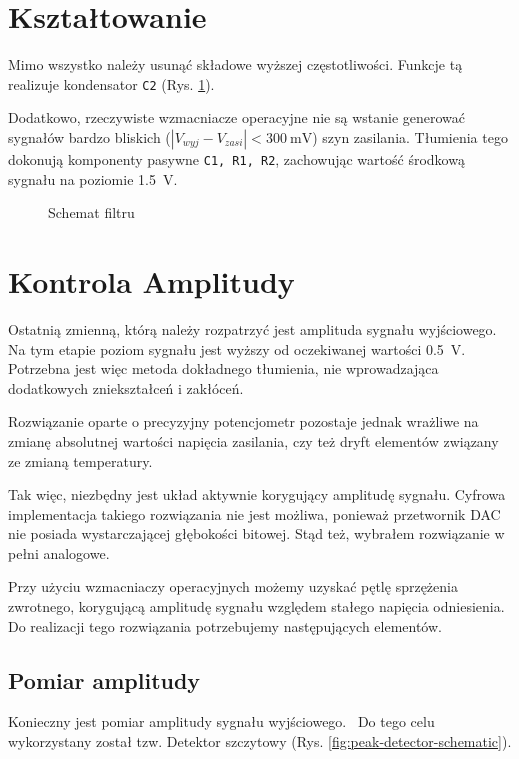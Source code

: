 \documentclass[12pt, a4paper]{article}
\begin{document}
\section{Kształtowanie}
Mimo wszystko należy usunąć składowe wyższej częstotliwości. Funkcje tą realizuje kondensator \verb|C2| (Rys. \ref{fig:filter}).

Dodatkowo, rzeczywiste wzmacniacze operacyjne nie są wstanie generować sygnałów bardzo bliskich ($ |V_{wyj} - V_{zasi}| <\qty{300}{\mV}$) szyn zasilania.
Tłumienia tego dokonują komponenty pasywne \verb|C1, R1, R2|, zachowując wartość środkową sygnału na poziomie \qty{1,5}{\V}.

\begin{figure}[h]
	\centering
	
	\caption{Schemat filtru}
	\label{fig:filter}
\end{figure}

\section{Kontrola Amplitudy}

Ostatnią zmienną, którą należy rozpatrzyć jest amplituda sygnału wyjściowego. Na tym etapie poziom sygnału jest wyższy od oczekiwanej wartości
\qty{0,5}{\V}. Potrzebna jest więc metoda dokładnego tłumienia, nie wprowadzająca dodatkowych zniekształceń i zakłóceń.

Rozwiązanie oparte o precyzyjny potencjometr pozostaje jednak wrażliwe na zmianę absolutnej wartości napięcia zasilania,
czy też dryft elementów związany ze zmianą temperatury.

Tak więc, niezbędny jest układ aktywnie korygujący amplitudę sygnału.
Cyfrowa implementacja takiego rozwiązania nie jest możliwa, 
ponieważ przetwornik DAC nie posiada wystarczającej głębokości bitowej. 
Stąd też, wybrałem rozwiązanie w pełni analogowe.

Przy użyciu wzmacniaczy operacyjnych możemy uzyskać pętlę sprzężenia zwrotnego, 
korygującą amplitudę sygnału względem stałego napięcia odniesienia.
Do realizacji tego rozwiązania potrzebujemy następujących elementów.

\subsection{Pomiar amplitudy}
Konieczny jest pomiar amplitudy sygnału wyjściowego. \
Do tego celu wykorzystany został tzw. Detektor szczytowy (Rys. \ref{fig:peak-detector-schematic}). 
\end{document}
